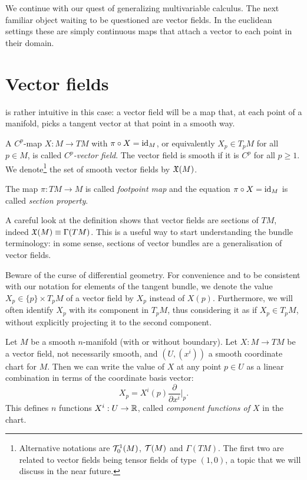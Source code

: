 We continue with our quest of generalizing multivariable calculus.
The next familiar object waiting to be questioned are vector fields.
In the euclidean settings these are simply continuous maps that attach a vector to each point in their domain.

\section{Vector fields}

 is rather intuitive in this case: a vector field will be a map that, at each point of a manifold, picks a tangent vector at that point in a smooth way.

\begin{definition}\label{def:vfield}
  A $C^p$-map $X: M \to TM$ with $\pi\circ X = \operatorname{id}_M$, or equivalently $X_p\in T_pM$ for all $p\in M$, is called \emph{$C^p$-vector field}.
  The vector field is smooth if it is $C^p$ for all $p\geq 1$.
  We denote\footnote{Alternative notations are $\mathcal{T}_0^1(M)$, $\mathcal{T}(M)$ and $\Gamma(TM)$. The first two are related to vector fields being tensor fields of type $(1,0)$, a topic that we will discuss in the near future.} the set of smooth vector fields by $\mathfrak{X}(M)$.

  The map $\pi:TM \to M$ is called \emph{footpoint map} and the equation $\pi\circ X = \operatorname{id}_M$ is called \emph{section property}.
\end{definition}

\begin{remark}
  A careful look at the definition shows that vector fields are sections of $TM$, indeed $\mathfrak{X}(M) \equiv \Gamma(TM)$.
  This is a useful way to start understanding the bundle terminology: in some sense, sections of vector bundles are a generalisation of vector fields.
\end{remark}

Beware of the curse of differential geometry.
For convenience and to be consistent with our notation for elements of the tangent bundle, we denote the value $X_p\in\{p\}\times T_p M$ of a vector field by $X_p$ instead of $X(p)$.
Furthermore, we will often identify $X_p$ with its component in $T_pM$, thus considering it as if $X_p\in T_pM$, without explicitly projecting it to the second component.

Let $M$ be a smooth $n$-manifold (with or without boundary).
Let $X:M\to TM$ be a vector field, not necessarily smooth, and $(U, (x^i))$ a smooth coordinate chart for $M$. Then we can write the value of $X$ at any point $p\in U$ as a linear combination in terms of the coordinate basis vector:
\begin{equation}\label{eq:vfCoordBAsis}
  X_p = X^i(p) \frac{\partial}{\partial x^i}\Big|_p.
\end{equation}
This defines $n$ functions $X^i: U\to\mathbb{R}$, called \emph{component functions of $X$} in the chart.

